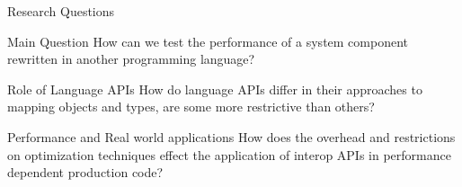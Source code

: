 
\begin{frame}{Research Questions}
    \begin{block}{Main Question}
        How can we test the performance of a system component rewritten in another programming language?
    \end{block}

    \pause

    \begin{block}{Role of Language APIs}
        How do language APIs differ in their approaches to mapping objects and types, are some more restrictive than others?
    \end{block}

    \pause

    \begin{block}{Performance and Real world applications}
        How does the overhead and restrictions on optimization techniques effect the application of interop APIs in performance dependent production code?
    \end{block}

\end{frame}
